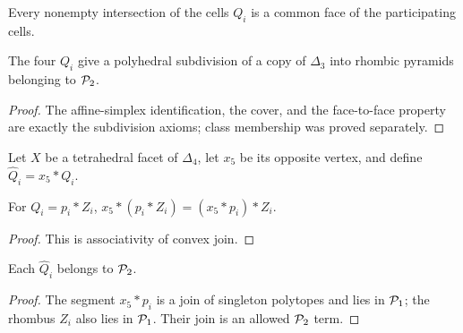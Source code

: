 \begin{lemma}
  \label{lem:tetrahedron-cell-faces}
  \notready
  Every nonempty intersection of the cells $Q_i$ is a common face of the
  participating cells.
\end{lemma}

\begin{corollary}
  \label{cor:tetrahedron-subdivision}
  The four $Q_i$ give a polyhedral subdivision of a copy of $\Delta_3$ into
  rhombic pyramids belonging to $\mathcal{P}_2$.
\end{corollary}
\begin{proof}
  The affine-simplex identification, the cover, and the face-to-face property
  are exactly the subdivision axioms; class membership was proved separately.
\end{proof}

\begin{definition}
  \label{constr:delta-four-cells}
  Let $X$ be a tetrahedral facet of $\Delta_4$, let $x_5$ be its opposite
  vertex, and define $\widehat Q_i=x_5*Q_i$.
\end{definition}

\begin{lemma}
  \label{lem:delta-four-cell-reassociate}
  For $Q_i=p_i*Z_i$,
  $x_5*(p_i*Z_i)=(x_5*p_i)*Z_i$.
\end{lemma}
\begin{proof}
  This is associativity of convex join.
\end{proof}

\begin{lemma}
  \label{lem:delta-four-cells-class-two}
  Each $\widehat Q_i$ belongs to $\mathcal{P}_2$.
\end{lemma}
\begin{proof}
  The segment $x_5*p_i$ is a join of singleton polytopes and lies in
  $\mathcal{P}_1$; the rhombus $Z_i$ also lies in $\mathcal{P}_1$.  Their join is an
  allowed $\mathcal{P}_2$ term.
\end{proof}

